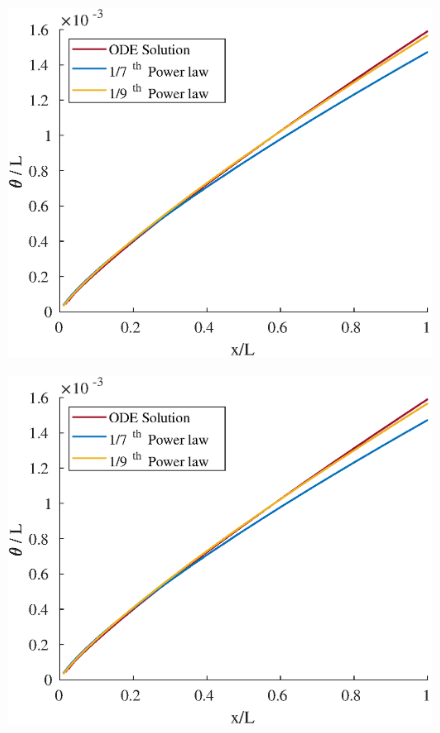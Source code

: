 


\begin{figure}[H]
\centering
\includegraphics[scale=0.53]{graphs/e4g1.eps}
\caption{}
\label{e6g1}
\end{figure}

\begin{figure}[H]
\centering
\includegraphics[scale=0.53]{graphs/e4g1.eps}
\caption{}
\label{e6g2}
\end{figure}

